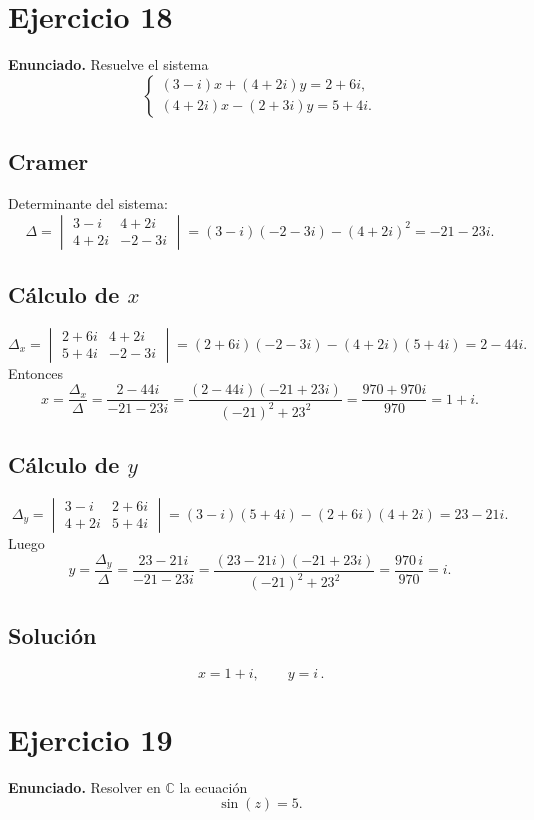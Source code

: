 \documentclass[fleqn]{article}
\begin{document}
\section*{Ejercicio 18}
\textbf{Enunciado.} Resuelve el sistema
\[
\begin{cases}
(3-i)x+(4+2i)y=2+6i,\\[2pt]
(4+2i)x-(2+3i)y=5+4i.
\end{cases}
\]

\subsection*{Cramer}
Determinante del sistema:
\[
\Delta=
\begin{vmatrix}
3-i & 4+2i\\
4+2i & -2-3i
\end{vmatrix}
=(3-i)(-2-3i)-(4+2i)^2
=-21-23i.
\]

\subsection*{Cálculo de $x$}
\[
\Delta_x=
\begin{vmatrix}
2+6i & 4+2i\\
5+4i & -2-3i
\end{vmatrix}
=(2+6i)(-2-3i)-(4+2i)(5+4i)
=2-44i.
\]
Entonces
\[
x=\frac{\Delta_x}{\Delta}
=\frac{2-44i}{-21-23i}
=\frac{(2-44i)(-21+23i)}{(-21)^2+23^2}
=\frac{970+970i}{970}=1+i.
\]

\subsection*{Cálculo de $y$}
\[
\Delta_y=
\begin{vmatrix}
3-i & 2+6i\\
4+2i & 5+4i
\end{vmatrix}
=(3-i)(5+4i)-(2+6i)(4+2i)
=23-21i.
\]
Luego
\[
y=\frac{\Delta_y}{\Delta}
=\frac{23-21i}{-21-23i}
=\frac{(23-21i)(-21+23i)}{(-21)^2+23^2}
=\frac{970\,i}{970}=i.
\]

\subsection*{Solución}
\[
\boxed{\,x=1+i,\qquad y=i\, }.
\]
\section*{Ejercicio 19}
\textbf{Enunciado.} Resolver en $\mathbb{C}$ la ecuación
\[
\sin(z)=5.
\]
\end{document}
